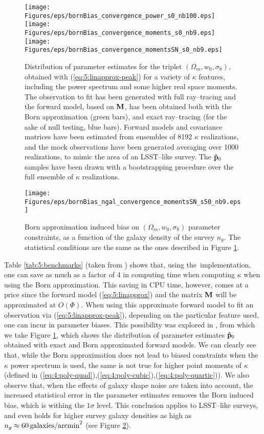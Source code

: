 % 
\begin{figure}
\begin{center}
\texttt{[image: Figures/eps/bornBias\_convergence\_power\_s0\_nb100.eps]}
\texttt{[image: Figures/eps/bornBias\_convergence\_moments\_s0\_nb9.eps]}
\texttt{[image: Figures/eps/bornBias\_convergence\_momentsSN\_s0\_nb9.eps]}
\end{center}
\caption{Distribution of parameter estimates for the triplet $(\Omega_m,w_0,\sigma_8)$, obtained with (\ref{eq:5:linapprox-peak}) for a variety of $\kappa$ features, including the power spectrum and some higher real space moments. The observation to fit has been generated with full ray--tracing and the forward model, based on $\mathbf{M}$, has been obtained both with the Born approximation (green bars), and exact ray--tracing (for the sake of null testing, blue bars). Forward models and covariance matrices have been estimated from ensembles of 8192 $\kappa$ realizations, and the mock observations have been generated averaging over 1000 realizations, to mimic the area of an LSST--like survey. The $\mathbf{\hat{p}}_0$ samples have been drawn with a bootstrapping procedure over the full ensemble of $\kappa$ realizations.}
\label{fig:5:biasfeat}
\end{figure}
%
\begin{figure}
\begin{center}
\texttt{[image: Figures/eps/bornBias\_ngal\_convergence\_momentsSN\_s50\_nb9.eps]}
\end{center}
\caption{Born approximation induced bias on $(\Omega_m,w_0,\sigma_8)$ parameter constraints, as a function of the galaxy density of the survey $n_g$. The statistical conditions are the same as the ones described in Figure \ref{fig:5:biasfeat}.}
\label{fig:5:biasng}
\end{figure}
%
Table \ref{tab:5:benchmarks} (taken from \citep{PetriBorn}) shows that, using the \LT\,implementation, one can save as much as a factor of 4 in computing time when computing $\kappa$ when using the Born approximation. This saving in CPU time, however, comes at a price since the forward model (\ref{eq:5:linapprox}) and the matrix $\mathbf{M}$ will be approximated at $O(\Phi)$. When using this approximate forward model to fit an observation via (\ref{eq:5:linapprox-peak}), depending on the particular feature used, one can incur in parameter biases. This possibility was explored in \citep{PetriBorn}, from which we take Figure \ref{fig:5:biasfeat}, which shows the distribution of parameter estimates $\mathbf{\hat{p}}_0$ obtained with exact and Born approximated forward models. We can clearly see that, while the Born approximation does not lead to biased constraints when the $\kappa$ power spectrum is used, the same is not true for higher point moments of $\kappa$ (defined in (\ref{eq:4:poly-quad}),(\ref{eq:4:poly-cubic}),(\ref{eq:4:poly-quartic})). We also observe that, when the effects of galaxy shape noise are taken into account, the increased statistical error in the parameter estimates removes the Born induced bias, which is withing the $1\sigma$ level. This conclusion applies to LSST--like surveys, and even holds for higher survey galaxy densities as high as $n_g\approx 60\,{\rm galaxies/arcmin}^2$ (see Figure \ref{fig:5:biasng}).  

